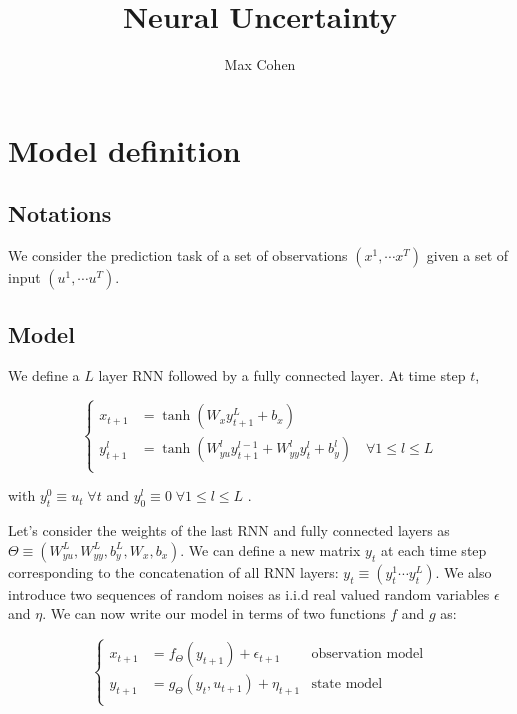 \documentclass[11pt,a4paper]{report}
\begin{document}
\title{Neural Uncertainty}
\author{Max Cohen}
\maketitle

\chapter{Model definition}
\section{Notations}
We consider the prediction task of a set of observations $(x^1, \cdots x^T)$ given a set of input $(u^1, \cdots u^T)$.

\section{Model}
We define a $L$ layer RNN followed by a fully connected layer. At time step $t$,

\begin{equation*}
    \left\{
    \begin{aligned}
        x_{t+1}   & = \tanh(W_x y_{t+1}^L + b_x)                                                               \\
        y_{t+1}^l & = \tanh(W_{yu}^l y^{l-1}_{t+1} + W_{yy}^l y^{l}_{t} + b_y^l) \quad \forall 1 \leq l \leq L \\
    \end{aligned}
    \right.
\end{equation*}

with $y_{t}^0 \equiv u_{t} \; \forall t$ and $y_{0}^l \equiv 0 \; \forall 1 \leq l \leq L$ .

Let's consider the weights of the last RNN and fully connected layers as $\Theta \equiv (W_{yu}^L, W_{yy}^L, b_y^L, W_x, b_x)$. We can define a new matrix $y_t$ at each time step corresponding to the concatenation of all RNN layers: $y_t \equiv (y_t^1 \cdots y_t^L)$. We also introduce two sequences of random noises as i.i.d real valued random variables $\epsilon$ and $\eta$. We can now write our model in terms of two functions $f$ and $g$ as:

\begin{equation}
    \left\{
    \begin{aligned}
        x_{t+1} & = f_\Theta(y_{t+1}) + \epsilon_{t+1}      & \text{observation model} \\
        y_{t+1} & = g_\Theta(y_{t}, u_{t+1}) + \eta_{t+1} & \text{state model}       \\
    \end{aligned}
    \right.
\end{equation}
\end{document}
